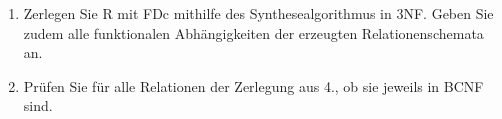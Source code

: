 \documentclass{lehramt-informatik-aufgabe}
\begin{document}
\begin{enumerate}
\begin{enumerate}
\end{enumerate}

\item Zerlegen Sie R mit FDc mithilfe des Synthesealgorithmus in 3NF.
Geben Sie zudem alle funktionalen Abhängigkeiten der erzeugten
Relationenschemata an.


\item Prüfen Sie für alle Relationen der Zerlegung aus 4., ob sie
jeweils in BCNF sind.

\end{enumerate}
\end{document}
